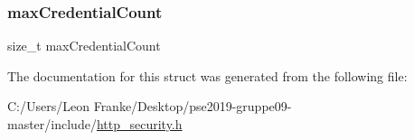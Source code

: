 \mbox{\label{structcredential_array_a763fa132eca6baad8db40a2946ad5f3e}} 
\subsubsection{\texorpdfstring{max\+Credential\+Count}{maxCredentialCount}}
{\footnotesize\ttfamily size\+\_\+t max\+Credential\+Count}



The documentation for this struct was generated from the following file\+:\begin{DoxyCompactItemize}
\item 
C\+:/\+Users/\+Leon Franke/\+Desktop/pse2019-\/gruppe09-\/master/include/\mbox{\hyperlink{http__security_8h}{http\+\_\+security.\+h}}\end{DoxyCompactItemize}
